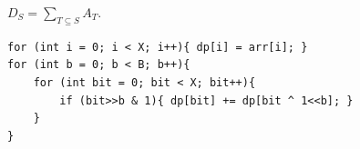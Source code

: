 $D_S = \sum_{T \subseteq S} A_T$.

\begin{verbatim}
for (int i = 0; i < X; i++){ dp[i] = arr[i]; }
for (int b = 0; b < B; b++){
	for (int bit = 0; bit < X; bit++){
		if (bit>>b & 1){ dp[bit] += dp[bit ^ 1<<b]; }
	}
}
\end{verbatim}